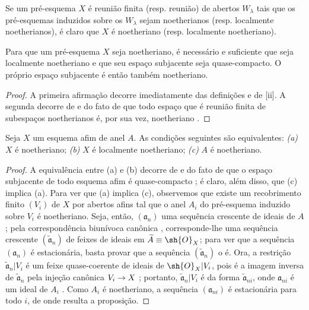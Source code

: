 \documentclass[oneside]{amsart}
\makeatletter
\newcommand{\ega@arrow}[2]{\mathchoice{#1}{#2}{#2}{#2}}
\renewcommand{\to}{\ega@arrow{\longrightarrow}{\rightarrow}}
\let\EGAOriginalLabel\label
\renewcommand{\label}[1]{\phantomsection\EGAOriginalLabel{#1}}
\makeatother
\begin{document}
Se um pré-esquema $X$ é reunião finita (resp. reunião) de abertos
$W_\lambda$ tais que os pré-esquemas induzidos sobre os $W_\lambda$ sejam
noetherianos (resp. localmente noetherianos), é claro que $X$ é noetheriano
(resp. localmente noetheriano).

\begin{proposition}[6.1.2]
\label{I.6.1.2}
Para que um pré-esquema $X$ seja noetheriano, é necessário e suficiente que
seja localmente noetheriano e que seu espaço subjacente seja quase-compacto.
O próprio espaço subjacente é então também noetheriano.
\end{proposition}

\begin{proof}
A primeira afirmação decorre imediatamente das definições e de
[ii]. A segunda decorre de  e do fato de que
todo espaço que é reunião finita de subespaços noetherianos é, por sua vez,
noetheriano .
\end{proof}

\begin{proposition}[6.1.3]
\label{I.6.1.3}
Seja $X$ um esquema afim de anel $A$.
As condições seguintes são equivalentes:
\emph{(a)} $X$ é noetheriano;
\emph{(b)} $X$ é localmente noetheriano;
\emph{(c)} $A$ é noetheriano.
\end{proposition}

\begin{proof}
A equivalência entre (a) e (b) decorre de  e do fato de que o
espaço subjacente de todo esquema afim é quase-compacto
; é claro, além disso, que (c) implica (a). Para ver que (a)
implica (c), observemos que existe um recobrimento finito $(V_i)$ de $X$ por
abertos afins tal que o anel $A_i$ do pré-esquema induzido sobre $V_i$ é
noetheriano. Seja, então, $(\mathfrak{a}_n)$ uma sequência crescente de
ideais de $A$; pela correspondência biunívoca canônica ,
corresponde-lhe uma sequência crescente $(\widetilde{\mathfrak{a}}_n)$ de
feixes de ideais em $\widetilde{A}\equiv\sh{O}_X$; para ver que a sequência
$(\mathfrak{a}_n)$ é estacionária, basta provar que a sequência
$(\widetilde{\mathfrak{a}}_n)$ o é. Ora, a restrição
$\widetilde{\mathfrak{a}}_n|V_i$ é um feixe quase-coerente de ideais de
$\sh{O}_X|V_i$, pois é a imagem inversa de $\widetilde{\mathfrak{a}}_n$ pela
injeção canônica $V_i\to X$ ; portanto,
$\widetilde{\mathfrak{a}}_n|V_i$ é da forma
$\widetilde{\mathfrak{a}}_{ni}$, onde $\mathfrak{a}_{ni}$ é um ideal de
$A_i$ . Como $A_i$ é noetheriano, a sequência
$(\mathfrak{a}_{ni})$ é estacionária para todo $i$, de onde resulta a
proposição.
\end{proof}
\end{document}
